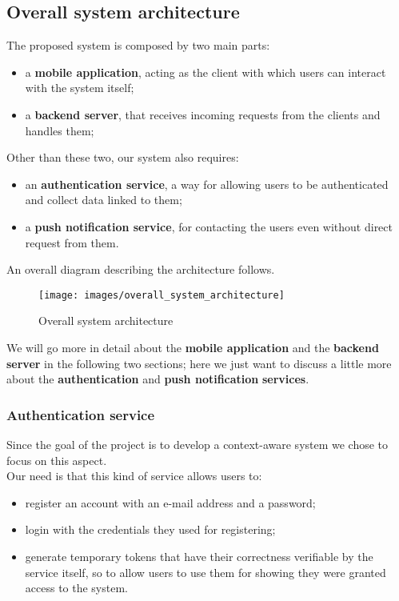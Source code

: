 \documentclass[../../main]{subfiles}
\begin{document}
\label{ss:overall-system-architecture}
\subsection{Overall system architecture}
The proposed system is composed by two main parts:
\begin{itemize}
    \item a \textbf{mobile application}, acting as the client with which users can interact with the system itself;
    \item a \textbf{backend server}, that receives incoming requests from the clients and handles them;
\end{itemize}
Other than these two, our system also requires:
\begin{itemize}
    \item an \textbf{authentication service}, a way for allowing users to be authenticated and collect data linked to them;
    \item a \textbf{push notification service}, for contacting the users even without direct request from them.
\end{itemize}
An overall diagram describing the architecture follows.
\begin{figure}[h]
    \centering
    \texttt{[image: images/overall\_system\_architecture]}
    \caption{Overall system architecture}\label{fig:overall_system_architecture}
\end{figure}

\noindent
We will go more in detail about the \textbf{mobile application} and the \textbf{backend server} in the following two sections; here we just want to discuss a little more about the \textbf{authentication} and \textbf{push notification} \textbf{services}.
\newpage
\subsubsection{Authentication service}
Since the goal of the project is to develop a context-aware system we chose to focus on this aspect.
\\Our need is that this kind of service allows users to:
\begin{itemize}
    \item register an account with an e-mail address and a password;
    \item login with the credentials they used for registering;
    \item generate temporary tokens that have their correctness verifiable by the service itself, so to allow users to use them for showing they were granted access to the system.
\end{itemize}
\end{document}
